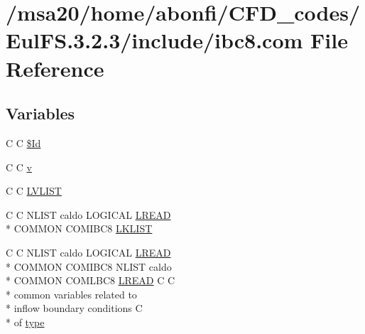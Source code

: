 \hypertarget{msa20_2home_2abonfi_2_c_f_d__codes_2_eul_f_s_83_82_83_2include_2ibc8_8com}{\section{/msa20/home/abonfi/\-C\-F\-D\-\_\-codes/\-Eul\-F\-S.3.2.3/include/ibc8.com File Reference}
\label{msa20_2home_2abonfi_2_c_f_d__codes_2_eul_f_s_83_82_83_2include_2ibc8_8com}
}
\subsection*{Variables}
\begin{DoxyCompactItemize}
\item 
C C \hyperlink{msa20_2home_2abonfi_2_c_f_d__codes_2_eul_f_s_83_82_83_2include_2ibc8_8com_af40bd3a96fc1553c00422342f92046b8}{\$\-Id}
\item 
C C \hyperlink{msa20_2home_2abonfi_2_c_f_d__codes_2_eul_f_s_83_82_83_2include_2ibc8_8com_a8961853e9a171af64fe80e35da93a2e0}{v}
\item 
C C \hyperlink{msa20_2home_2abonfi_2_c_f_d__codes_2_eul_f_s_83_82_83_2include_2ibc8_8com_aa711cf0c6b8e59731943e29410730275}{L\-V\-L\-I\-S\-T}
\item 
C C N\-L\-I\-S\-T caldo L\-O\-G\-I\-C\-A\-L \hyperlink{home_2abonfi_2_c_f_d__codes_2_eul_f_s_83_84_2include_2flags_8com_aea278b60e9a744704973b7b8aecd9442}{L\-R\-E\-A\-D} \\*
C\-O\-M\-M\-O\-N C\-O\-M\-I\-B\-C8 \hyperlink{msa20_2home_2abonfi_2_c_f_d__codes_2_eul_f_s_83_82_83_2include_2ibc8_8com_ad61abb12bb3aea850116ed8eb2156f2b}{L\-K\-L\-I\-S\-T}
\item 
C C N\-L\-I\-S\-T caldo L\-O\-G\-I\-C\-A\-L \hyperlink{home_2abonfi_2_c_f_d__codes_2_eul_f_s_83_84_2include_2flags_8com_aea278b60e9a744704973b7b8aecd9442}{L\-R\-E\-A\-D} \\*
C\-O\-M\-M\-O\-N C\-O\-M\-I\-B\-C8 N\-L\-I\-S\-T caldo \\*
C\-O\-M\-M\-O\-N C\-O\-M\-L\-B\-C8 \hyperlink{home_2abonfi_2_c_f_d__codes_2_eul_f_s_83_84_2include_2flags_8com_aea278b60e9a744704973b7b8aecd9442}{L\-R\-E\-A\-D} C C \\*
common variables related to \\*
inflow boundary conditions C \\*
of \hyperlink{msa20_2home_2abonfi_2_c_f_d__codes_2_eul_f_s_83_82_83_2include_2ibc8_8com_a631c5c1ddd478437aa8e7f1d42a3b59d}{type}

\end{DoxyCompactItemize}
